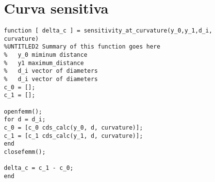 \section{Curva sensitiva}

\begin{lstlisting}[frame=single]
function [ delta_c ] = sensitivity_at_curvature(y_0,y_1,d_i, curvature)
%UNTITLED2 Summary of this function goes here
%   y_0 miminum distance
%   y1 maximum_distance
%   d_i vector of diameters
%   d_i vector of diameters
c_0 = [];
c_1 = [];

openfemm();
for d = d_i;
c_0 = [c_0 cds_calc(y_0, d, curvature)];
c_1 = [c_1 cds_calc(y_1, d, curvature)];
end
closefemm();

delta_c = c_1 - c_0;
end



\end{lstlisting}